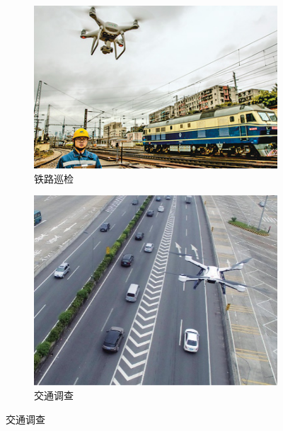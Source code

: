 \begin{figure}[!htbp]
    \centering
    \begin{subfigure}[t]{0.35\textwidth}
        \captionsetup{justification=centering}
        \begin{minipage}[b]{1\linewidth}
            \includegraphics[width=\textwidth]{./images/铁路巡检.png}
            \caption{铁路巡检}
        \end{minipage}
    \end{subfigure}
    \begin{subfigure}[t]{0.3\textwidth}
        \captionsetup{justification=centering}
        \begin{minipage}[b]{1\linewidth}
            \includegraphics[width=\textwidth]{./images/交通调查.png}
            \caption{交通调查}

\end{minipage}
\end{subfigure}
\end{figure}
